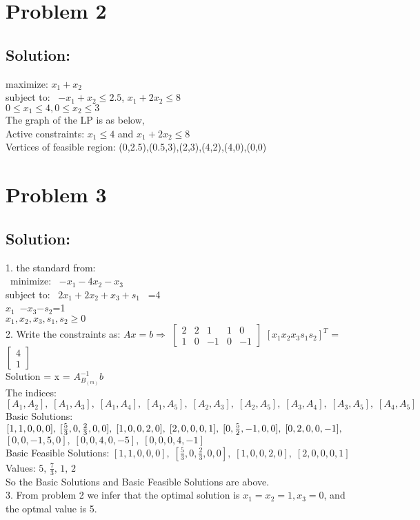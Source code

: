 \documentclass{article}
\begin{document}
{{\section*{Problem 2}
\subsection*{Solution:}
maximize: \quad $x_1+x_2$ \\ 
subject to: \, $-x_1+x_2 \leq 2.5$, \quad $x_1+2x_2 \leq 8$\\ \hspace*{70pt} $ 0 \leq x_1 \leq 4, $\quad $0\leq x_2 \leq 3$ \\ 
The graph of the LP is as below,\\ Active constraints: $x_1 \leq 4 $ and $x_1+2x_2 \leq 8$\\ 
Vertices of feasible region: (0,2.5),(0.5,3),(2,3),(4,2),(4,0),(0,0)

\section*{Problem 3}
\subsection*{Solution:}
1. \; the standard from: \\ \, minimize: \, $-x_1-4x_2-x_3$\\ 
subject to: \, $2x_1+2x_2+x_3+s_1$ \quad \quad \, =4\\
\hspace*{70pt}$x_1$\quad \quad \quad \, $-x_3$\quad \quad \quad$-s_2$=1\\ 
\hspace*{70pt}$x_1,x_2,x_3,s_1,s_2 \geq 0$\\ 
2. \; Write the constraints as: $Ax=b \Rightarrow $
$\begin{bmatrix}
2&2&1&1&0\\1&0&-1&0&-1
\end{bmatrix}$ $[x_1 x_2 x_3 s_1 s_2]^T$ = $\begin{bmatrix} 4\\1 \end{bmatrix}$\\
Solution = x = $A^{-1}_{B_(m)}b$\\
The indices: $[A_1,A_2],\;[A_1,A_3],\;[A_1,A_4],\;[A_1,A_5],\;[A_2,A_3],\;[A_2,A_5],\;[A_3,A_4],\;[A_3,A_5],\;[A_4,A_5]$\\
Basic Solutions: $[1,1,0,0,0],\;[\frac{5}{3},0,\frac{2}{3},0,0],\;[1,0,0,2,0],\;[2,0,0,0,1],\;[0,\frac{5}{2},-1,0,0],\;[0,2,0,0,-1],\;\\ $\hspace*{85pt}$[0,0,-1,5,0],\;[0,0,4,0,-5],\;[0,0,0,4,-1]$\\ 
Basic Feasible Solutions: $[1,1,0,0,0],\;[\frac{5}{3},0,\frac{2}{3},0,0],\;[1,0,0,2,0],\;[2,0,0,0,1]$\\ 
Values: $5,\,\frac{7}{3},\,1,\,2$\\ 
So the Basic Solutions and Basic Feasible Solutions are above.\\ 
3. \; From problem 2 we infer that the optimal solution is $x_1=x_2=1,x_3=0$, and the optmal value is 5.

}}
\end{document}
